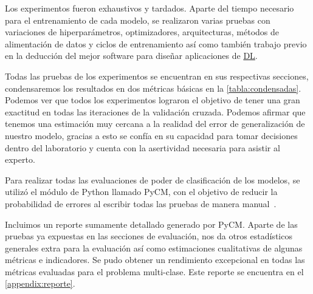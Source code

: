Los experimentos fueron exhaustivos y tardados. Aparte del tiempo necesario para
el entrenamiento de cada modelo, se realizaron varias pruebas con variaciones de
hiperparámetros, optimizadores, arquitecturas, métodos de alimentación de datos
y ciclos de entrenamiento así como también trabajo previo en la deducción del
mejor software para diseñar aplicaciones de \hyperlink{abbr}{DL}.

Todas las pruebas de los experimentos se encuentran en sus respectivas
secciones, condensaremos los resultados en dos métricas básicas en la
\autoref{tabla:condensadas}. Podemos ver que todos los experimentos lograron el
objetivo de tener una gran exactitud en todas las iteraciones de la validación
cruzada. Podemos afirmar que tenemos una estimación muy cercana a la realidad
del error de generalización de nuestro modelo, gracias a esto se confía en su
capacidad para tomar decisiones dentro del laboratorio y cuenta con la
asertividad necesaria para asistir al experto.

\begin{table}[H]
    \centering
    \caption{Métricas condensadas de los experimentos}\label{tabla:condensadas}
\end{table}

Para realizar todas las evaluaciones de poder de clasificación de los modelos,
se utilizó el módulo de Python llamado PyCM, con el objetivo de
reducir la probabilidad de errores al escribir todas las pruebas de manera
manual~\cite{Haghighi2018}.

Incluimos un reporte sumamente detallado generado por PyCM. Aparte de las
pruebas ya expuestas en las secciones de evaluación, nos da otros estadísticos
generales extra para la evaluación así como estimaciones cualitativas de algunas
métricas e indicadores. Se pudo obtener un rendimiento excepcional en todas las
métricas evaluadas para el problema multi-clase. Este reporte se encuentra en el
\autoref{appendix:reporte}. 



